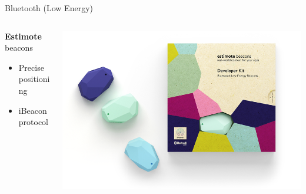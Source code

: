 \documentclass[11pt]{beamer}
\begin{document}
\begin{frame}{Bluetooth (Low Energy)}
	
	\begin{columns}[onlytextwidth]

		\begin{column}{.45\textwidth}
		
			\textbf{Estimote} beacons

			\vspace{0.5cm}
			
			\begin{itemize}
				\setlength{\itemsep}{0.75ex}
				\item Precise positioning
				\item iBeacon protocol
			\end{itemize}
			
		\end{column}
		
		\begin{column}{.55\textwidth}
		
			\includegraphics[width=\textwidth]{box_devkit}
			
		\end{column}
	
	\end{columns}

\end{frame}
\end{document}
